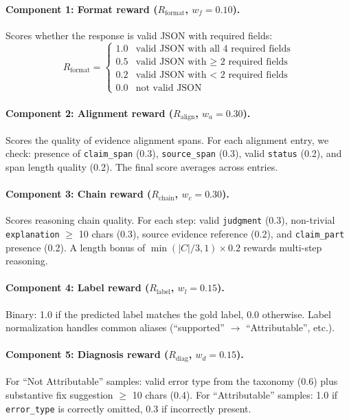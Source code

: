 \documentclass{article}
\begin{document}
\paragraph{Component 1: Format reward ($R_{\text{format}}$, $w_f = 0.10$).}
Scores whether the response is valid JSON with required fields:
\begin{equation}
R_{\text{format}} = \begin{cases}
1.0 & \text{valid JSON with all 4 required fields} \\
0.5 & \text{valid JSON with $\geq$ 2 required fields} \\
0.2 & \text{valid JSON with $<$ 2 required fields} \\
0.0 & \text{not valid JSON}
\end{cases}
\end{equation}

\paragraph{Component 2: Alignment reward ($R_{\text{align}}$, $w_a = 0.30$).}
Scores the quality of evidence alignment spans.
For each alignment entry, we check: presence of \texttt{claim\_span} (0.3), \texttt{source\_span} (0.3), valid \texttt{status} (0.2), and span length quality (0.2).
The final score averages across entries.

\paragraph{Component 3: Chain reward ($R_{\text{chain}}$, $w_c = 0.30$).}
Scores reasoning chain quality.
For each step: valid \texttt{judgment} (0.3), non-trivial \texttt{explanation} $\geq$ 10 chars (0.3), source evidence reference (0.2), and \texttt{claim\_part} presence (0.2).
A length bonus of $\min(|C|/3, 1) \times 0.2$ rewards multi-step reasoning.

\paragraph{Component 4: Label reward ($R_{\text{label}}$, $w_l = 0.15$).}
Binary: 1.0 if the predicted label matches the gold label, 0.0 otherwise.
Label normalization handles common aliases (``supported'' $\to$ ``Attributable'', etc.).

\paragraph{Component 5: Diagnosis reward ($R_{\text{diag}}$, $w_d = 0.15$).}
For ``Not Attributable'' samples: valid error type from the taxonomy (0.6) plus substantive fix suggestion $\geq$ 10 chars (0.4).
For ``Attributable'' samples: 1.0 if \texttt{error\_type} is correctly omitted, 0.3 if incorrectly present.
\end{document}
